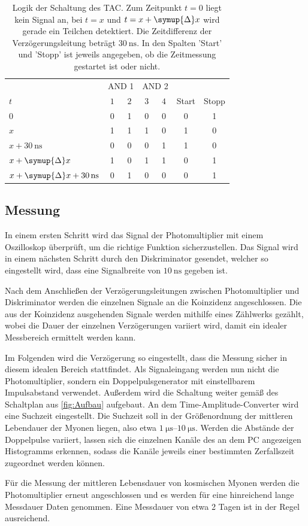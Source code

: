  \begin{table}
    \centering
    \caption{Logik der Schaltung des TAC. Zum Zeitpunkt $t=0$ liegt kein Signal an, bei $t=x$ und $t=x+\symup{\Delta}x$ wird gerade ein Teilchen detektiert. %
    Die Zeitdifferenz der Verzögerungsleitung beträgt $\qty{30}{\nano\second}$. In den Spalten 'Start' und 'Stopp' ist jeweils angegeben, ob die Zeitmessung %
    gestartet ist oder nicht.}
    \label{tab:Logik}
    \begin{tabular}{l | c c | c c | c c}
      \toprule
      {} & \multicolumn{2}{c|}{AND 1} & \multicolumn{2}{c|}{AND 2} & {} & {} \\
      $t$ & $1$ & $2$ & $3$ & $4$ & Start & Stopp \\
      \midrule
      $0$                                               & 0 & 1 & 0 & 0 & 0 & 1 \\
      $x$                                               & 1 & 1 & 1 & 0 & 1 & 0 \\
      {$x + \qty{30}{\nano\second}$}                    & 0 & 0 & 0 & 1 & 1 & 0 \\
      {$x + \symup{\Delta}x$}                           & 1 & 0 & 1 & 1 & 0 & 1 \\
      {$x + \symup{\Delta}x + \qty{30}{\nano\second}$}  & 0 & 1 & 0 & 0 & 0 & 1 \\      
      
      \bottomrule
    \end{tabular}
  \end{table}

  \subsection{Messung}
  \label{subsec:Messung}
  In einem ersten Schritt wird das Signal der Photomultiplier mit einem Oszilloskop überprüft, um die richtige Funktion sicherzustellen. Das Signal wird in einem nächsten Schritt durch den
  Diskriminator gesendet, welcher so eingestellt wird, dass eine Signalbreite von $\qty{10}{\nano\second}$ gegeben ist.

  Nach dem Anschließen der Verzögerungsleitungen zwischen Photomultiplier und Diskriminator werden die einzelnen Signale an die Koinzidenz angeschlossen. Die aus der Koinzidenz ausgehenden
  Signale werden mithilfe eines Zählwerks gezählt, wobei die Dauer der einzelnen Verzögerungen variiert wird, damit ein idealer Messbereich ermittelt werden kann.

  Im Folgenden wird die Verzögerung so eingestellt, dass die Messung sicher in diesem idealen Bereich stattfindet. Als Signaleingang werden nun nicht die Photomultiplier, sondern
  ein Doppelpulsgenerator mit einstellbarem Impulsabstand verwendet. Außerdem wird die Schaltung weiter gemäß des Schaltplan aus \autoref{fig:Aufbau} aufgebaut. An dem 
  Time-Amplitude-Converter wird eine Suchzeit eingestellt. Die Suchzeit soll in der Größenordnung der mittleren Lebendauer der Myonen liegen, also etwa $\qtyrange{1}{10}{\micro\second}$.
  Werden die Abstände der Doppelpulse variiert, lassen sich die einzelnen Kanäle des an dem PC angezeigen Histogramms erkennen, sodass die Kanäle jeweils einer bestimmten Zerfallszeit
  zugeordnet werden können.

  Für die Messung der mittleren Lebensdauer von kosmischen Myonen werden die Photomultiplier erneut angeschlossen und es werden für eine hinreichend lange Messdauer Daten genommen. Eine
  Messdauer von etwa 2 Tagen ist in der Regel ausreichend.
